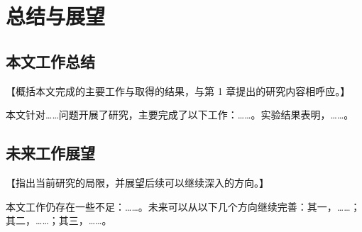 \section{总结与展望}

\subsection{本文工作总结}

【概括本文完成的主要工作与取得的结果，与第 1 章提出的研究内容相呼应。】

本文针对……问题开展了研究，主要完成了以下工作：……。实验结果表明，……。

\subsection{未来工作展望}

【指出当前研究的局限，并展望后续可以继续深入的方向。】

本文工作仍存在一些不足：……。未来可以从以下几个方向继续完善：其一，……；其二，……；其三，……。
